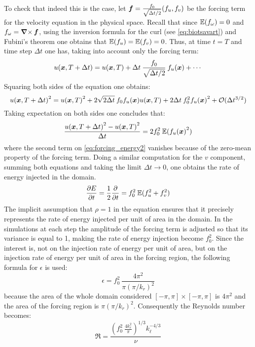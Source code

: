 \documentclass[../main.tex]{subfiles}
\begin{document}
To check that indeed this is the case, let $\boldsymbol{f}=\frac{f_0}{\sqrt{\Delta t/2}}(f_u,f_v)$ be the forcing term for the velocity equation in the physical space. Recall that since $\mathbb{E}(f_\omega)=0$ and $f_\omega = \operatorname{\boldsymbol{\nabla}\times} \boldsymbol{f}$, using the inversion formula for the curl (see \cref{eq:biotsavart}) and Fubini's theorem one obtains that $\mathbb{E}(f_u) = \mathbb{E}(f_v) = 0$. Thus, at time $t=T$ and time step $\Delta t$ one has, taking into account only the forcing term:
\begin{equation}
	u(\boldsymbol{x},T+\Delta t) = u(\boldsymbol{x},T) + \Delta t \:\frac{f_0}{\sqrt{\Delta t/2}}\: f_u(\boldsymbol{x}) + \cdots
\end{equation}
Squaring both sides of the equation one obtains:
\begin{equation}\label{eq:forcing_energy2}
	{u(\boldsymbol{x},T+\Delta t)}^2 = {u(\boldsymbol{x},T)}^2 + 2\sqrt{2\Delta t}\: f_0 f_u(\boldsymbol{x}) u(\boldsymbol{x},T) +2 \Delta t \: f_0^2 {f_u(\boldsymbol{x})}^2 + \mathcal{O}(\Delta t^{3/2})
\end{equation}
Taking expectation on both sides one concludes that:
\begin{equation}
	\frac{{u(\boldsymbol{x},T+\Delta t)}^2 - {u(\boldsymbol{x},T)}^2}{\Delta t} = 2f_0^2\: \mathbb{E}({f_u(\boldsymbol{x})}^2)
\end{equation}
where the second term on \cref{eq:forcing_energy2} vanishes because of the zero-mean property of the forcing term. Doing a similar computation for the $v$ component, summing both equations and taking the limit $\Delta t \to 0$, one obtains the rate of energy injected in the domain.
\begin{equation}
	\pdv{E}{t}=\frac{1}{2}\pdv{}{t}(u^2 + v^2) = f_0^2\: \mathbb{E}(f_u^2 + f_v^2)
\end{equation}
The implicit assumption that $\rho=1$ in the equation ensures that it precisely represents the rate of energy injected per unit of area in the domain. In the simulations at each step the amplitude of the forcing term is adjusted so that its variance is equal to 1, making the rate of energy injection become $f_0^2$. Since the interest is, not on the injection rate of energy per unit of area, but on the injection rate of energy per unit of area in the forcing region, the following formula for $\epsilon$ is used:
\begin{equation}\label{eq:epsilon}
	\epsilon = f_0^2\: \frac{4 \pi^2}{\pi {(\pi / k_r)}^2}
\end{equation}
because the area of the whole domain considered $[-\pi,\pi]\times[-\pi,\pi]$ is $4\pi^2$ and the area of the forcing region is $\pi {(\pi / k_r)}^2$. Consequently the Reynolds number becomes:
\begin{equation}\label{eq:reynolds}
	\Re = \frac{{\left( f_0^2\:\frac{4 k_r^2}{\pi} \right)}^{1/3} k_\ell^{-4/3}}{\nu}
\end{equation}
\end{document}
